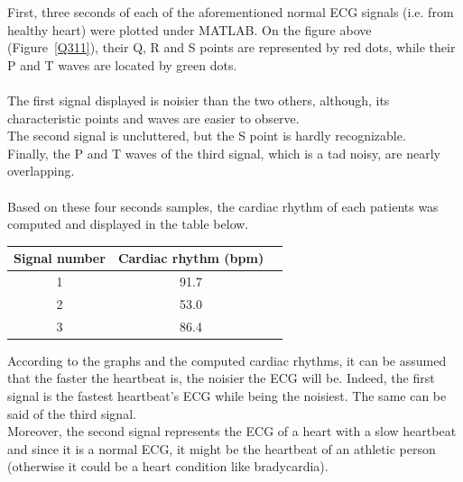 \documentclass[11pt]{article}
\begin{document}
		First, three seconds of each of the aforementioned normal ECG signals (i.e. from healthy heart) were plotted under MATLAB. On the figure above (Figure~\ref{Q311}), their Q, R and S points are represented by red dots, while their P and T waves are located by green dots.  \\
		\\
		The first signal displayed is noisier than the two others, although, its characteristic points and waves are easier to observe.\\
		The second signal is uncluttered, but the S point is hardly recognizable.\\
		Finally, the P and T waves of the third signal, which is a tad noisy, are nearly overlapping.\\
		\\
		Based on these four seconds samples, the cardiac rhythm of each patients was computed and displayed in the table below.\\
		\begin{center}
			\begin{tabular}{|c|c|c|}
				\hline
				\textbf{Signal number} & \textbf{Cardiac rhythm (bpm)} \\
				\hline
				1 & 91.7 \\ 
				\hline
				2 & 53.0 \\
				\hline
				3 & 86.4 \\
				\hline
			\end{tabular}
		\end{center}
		According to the graphs and the computed cardiac rhythms, it can be assumed that the faster the heartbeat is, the noisier the ECG will be. Indeed, the first signal is the fastest heartbeat's ECG while being the noisiest. The same can be said of the third signal.\\
		Moreover, the second signal represents the ECG of a heart with a slow heartbeat and since it is a normal ECG, it might be the heartbeat of an athletic person (otherwise it could be a heart condition like bradycardia).\\
		\\
\end{document}
